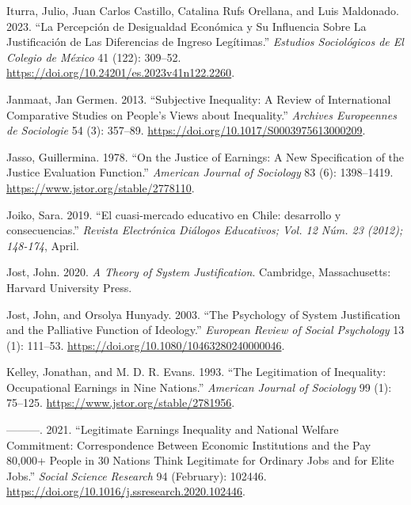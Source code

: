 \documentclass[
]{article}
\newlength{\cslhangindent}
\newenvironment{CSLReferences}[2] %
 {\begin{list}{}{%
  \setlength{\itemindent}{0pt}
  \setlength{\leftmargin}{0pt}
  \setlength{\parsep}{0pt}
  \ifodd #1
   \setlength{\leftmargin}{\cslhangindent}
   \setlength{\itemindent}{-1\cslhangindent}
  \fi
  \setlength{\itemsep}{#2\baselineskip}}}
 {\end{list}}
\begin{document}
\begin{CSLReferences}{1}{0}
Iturra, Julio, Juan Carlos Castillo, Catalina Rufs Orellana, and Luis
Maldonado. 2023. {``La Percepci{ó}n de Desigualdad Econ{ó}mica y Su
Influencia Sobre La Justificaci{ó}n de Las Diferencias de Ingreso
Leg{í}timas.''} \emph{Estudios Sociol{ó}gicos de El Colegio de M{é}xico}
41 (122): 309--52. \url{https://doi.org/10.24201/es.2023v41n122.2260}.

Janmaat, Jan Germen. 2013. {``Subjective Inequality: {A} Review of
International Comparative Studies on People's Views about Inequality.''}
\emph{Archives Europeennes de Sociologie} 54 (3): 357--89.
\url{https://doi.org/10.1017/S0003975613000209}.

Jasso, Guillermina. 1978. {``On the {Justice} of {Earnings}: {A New
Specification} of the {Justice Evaluation Function}.''} \emph{American
Journal of Sociology} 83 (6): 1398--1419.
\url{https://www.jstor.org/stable/2778110}.

Joiko, Sara. 2019. {``{El cuasi-mercado educativo en Chile: desarrollo y
consecuencias}.''} \emph{Revista Electr{ó}nica Di{á}logos Educativos;
Vol. 12 N{ú}m. 23 (2012); 148-174}, April.

Jost, John. 2020. \emph{A Theory of System Justification}. Cambridge,
Massachusetts: Harvard University Press.

Jost, John, and Orsolya Hunyady. 2003. {``The Psychology of System
Justification and the Palliative Function of Ideology.''} \emph{European
Review of Social Psychology} 13 (1): 111--53.
\url{https://doi.org/10.1080/10463280240000046}.

Kelley, Jonathan, and M. D. R. Evans. 1993. {``The Legitimation of
Inequality: {Occupational} Earnings in Nine Nations.''} \emph{American
Journal of Sociology} 99 (1): 75--125.
\url{https://www.jstor.org/stable/2781956}.

---------. 2021. {``Legitimate Earnings Inequality and National Welfare
Commitment: {Correspondence} Between Economic Institutions and the Pay
80,000+ People in 30 Nations Think Legitimate for Ordinary Jobs and for
Elite Jobs.''} \emph{Social Science Research} 94 (February): 102446.
\url{https://doi.org/10.1016/j.ssresearch.2020.102446}.


\end{CSLReferences}
\end{document}
